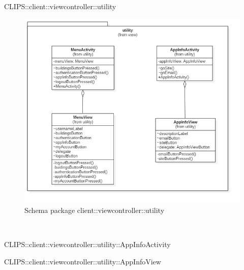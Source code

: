 \begin{componente}{CLIPS::client::viewcontroller::utility}
\begin{figure}[h!]
\centering
\includegraphics[scale=0.4]{img/package/png/client--viewcontroller--utility.png}
\caption{Schema package client::viewcontroller::utility}
 \end{figure}
\begin{compClassi} \\
\begin{classe}{CLIPS::client::viewcontroller::utility::AppInfoActivity}
\begin{classeMetodi}
\begin{classeMetodoArgomenti}
\end{classeMetodoArgomenti}
\end{classeMetodi}
\begin{classeRelazioni}
\end{classeRelazioni}
\end{classe}\begin{classe}{CLIPS::client::viewcontroller::utility::AppInfoView}

\end{classe}
\end{compClassi}
\end{componente}
